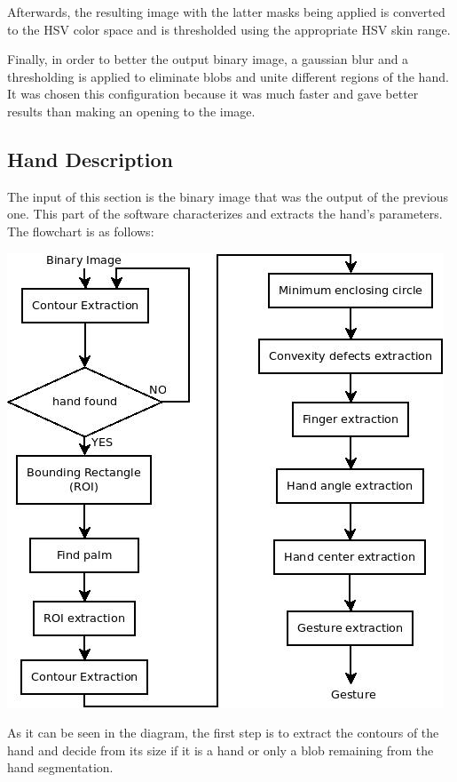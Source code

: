 \documentclass{article}
\begin{document}
Afterwards, the resulting image with the latter masks being applied is converted to the HSV color space and is thresholded using the appropriate HSV skin range.

Finally, in order to better the output binary image, a gaussian blur and a thresholding is applied to eliminate blobs and unite different regions of the hand. It was chosen this configuration because it was much faster and gave better results than making an opening to the image. 

 
\subsection{Hand Description}

The input of this section is the binary image that was the output of the previous one. This part of the software characterizes and extracts the hand's parameters. 
The flowchart is as follows: 

\begin{center}
\includegraphics[scale=0.5]{../hand_description.jpeg} 
\end{center}

As it can be seen in the diagram, the first step is to extract the contours of the hand and decide from its size if it is a hand or only a blob remaining from the hand segmentation. 
\end{document}
